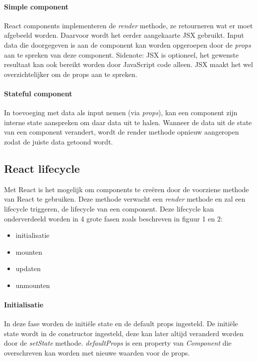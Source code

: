 \paragraph{Simple component}
React components implementeren de \textit{render} methode, ze retourneren wat er moet afgebeeld worden. Daarvoor wordt het eerder aangekaarte JSX gebruikt. Input data die doorgegeven is aan de component kan worden opgeroepen door de \textit{props} aan te spreken van deze component. Sidenote: JSX is optioneel, het gewenste resultaat kan ook bereikt worden door JavaScript code alleen. JSX maakt het wel overzichtelijker om de props aan te spreken.  
\autocite{React01}

\paragraph{Stateful component}
In toevoeging met data als input nemen (via \textit{props}), kan een component zijn interne state aanspreken om daar data uit te halen. Wanneer de data uit de state van een component verandert, wordt de render methode opnieuw aangeropen zodat de juiste data getoond wordt.
\autocite{React01}


\subsection{React lifecycle}
Met React is het mogelijk om components te creëren door de voorziene methode van React te gebruiken. Deze methode verwacht een \textit{render} methode en zal een lifecycle triggeren, de lifecycle van een component. 
Deze lifecycle kan onderverdeeld worden in 4 grote fasen zoals beschreven in figuur 1 en 2:
\begin{itemize}
	\item initialisatie
	\item mounten
	\item updaten
	\item unmounten
\end{itemize}

\paragraph{Initialisatie}
In deze fase worden de initiële state en de default props ingesteld. De initiële state wordt in de constructor ingesteld, deze kan later altijd veranderd worden door de \textit{setState} methode. \textit{defaultProps} is een property van \textit{Component} die overschreven kan worden met nieuwe waarden voor de props. 

